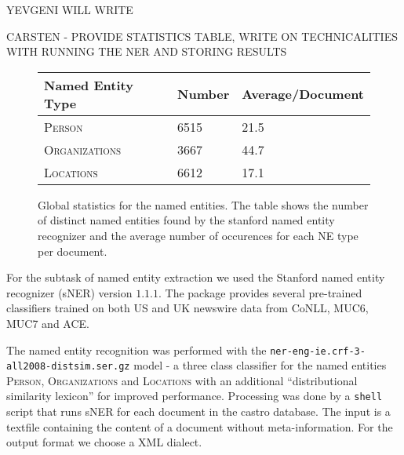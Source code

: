 
YEVGENI WILL WRITE

CARSTEN - PROVIDE STATISTICS TABLE, WRITE ON TECHNICALITIES WITH RUNNING THE NER AND STORING RESULTS
\begin{figure}[ht]
\centering
\caption{Global statistics for the named entities. The table shows the number of distinct named
entities found by the stanford named entity recognizer and the average number of occurences for
each NE type per document.}
\begin{tabular}{l|ll}
  Named Entity Type      & Number & Average/Document\\
  \hline
  \textsc{Person}        & 6515   & 21.5\\
  \textsc{Organizations} & 3667   & 44.7\\
  \textsc{Locations}     & 6612   & 17.1\\
\end{tabular}
\label{fig:ne_statistics}
\end{figure}

For the subtask of named entity extraction we used the Stanford named entity recognizer (sNER)
\cite{sner} version $1.1.1$. The package provides several pre-trained classifiers trained on both US
and UK newswire data from CoNLL, MUC6, MUC7 and ACE.

The named entity recognition was performed with the
\texttt{ner-eng-ie.crf-3-all2008-distsim.ser.gz} model - a three class classifier for the named
entities \textsc{Person}, \textsc{Organizations} and \textsc{Locations} with an additional
``distributional similarity lexicon'' for improved performance. Processing was done by a
\texttt{shell} script that runs sNER for each document in the castro database. The input is a
textfile containing the content of a document without meta-information. For the output format we
choose a XML dialect.

